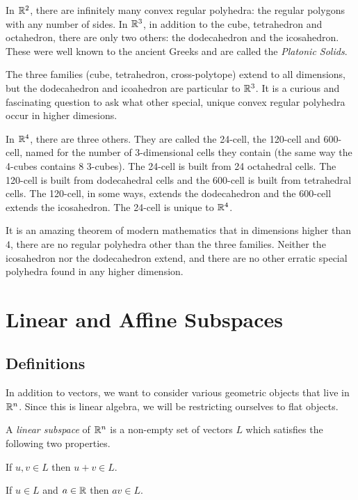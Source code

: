 \documentclass[fleqn]{report}
\begin{document}
In $\mathbb{R}^2$, there are infinitely many convex regular
polyhedra: the regular polygons with any number of sides. In
$\mathbb{R}^3$, in addition to the cube, tetrahedron and octahedron,
there are only two others: the dodecahedron and the
icosahedron. These were well known to the ancient Greeks and
are called the \emph{Platonic Solids}.

The three families (cube, tetrahedron, cross-polytope) extend
to all dimensions, but the dodecahedron and icoahedron are
particular to $\mathbb{R}^3$. It is a curious and fascinating
question to ask what other special, unique convex regular
polyhedra occur in higher dimesions.

In $\mathbb{R}^4$, there are three others. They are called the
24-cell, the 120-cell and 600-cell, named for the number of
3-dimensional cells they contain (the same way the
4-cubes contains 8 3-cubes). The 24-cell is built from 24
octahedral cells. The 120-cell is built from dodecahedral
cells and the 600-cell is built from tetrahedral cells. The
120-cell, in some ways, extends the dodecahedron and the
600-cell extends the icosahedron. The 24-cell is unique to
$\mathbb{R}^4$.

It is an amazing theorem of modern mathematics that in
dimensions higher than $4$, there are no regular polyhedra
other than the three families. Neither the icosahedron nor the
dodecahedron extend, and there are no other erratic special
polyhedra found in any higher dimension.

\chapter{Linear and Affine Subspaces}

\section{Definitions}

In addition to vectors, we want to consider various geometric
objects that live in $\mathbb{R}^n$. Since this is linear algebra,
we will be restricting ourselves to flat objects. 

\begin{defn}
A \emph{linear subspace} of $\mathbb{R}^n$ is a non-empty set of
vectors $L$ which satisfies the following two properties.
\begin{smallitemize}
\item If $u,v \in L$ then $u+v \in L$.
\item If $u \in L$ and $a \in \mathbb{R}$ then $av \in L$.
\end{smallitemize}
\end{defn}
\end{document}

